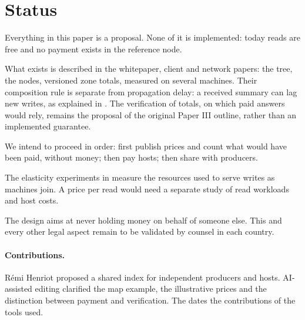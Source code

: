 \documentclass[11pt]{article}
\begin{document}
\section{Status}\hypertarget{ix:status}{}

Everything in this paper is a proposal. None of it is implemented: today reads are free and no payment exists in the reference node.

What exists is described in the whitepaper, client and network papers: the tree, the nodes, versioned zone totals, measured on several machines. Their composition rule is separate from propagation delay: a received summary can lag new writes, as explained in . The verification of totals, on which paid answers would rely, remains the proposal of the original Paper III outline, rather than an implemented guarantee.

We intend to proceed in order: first publish prices and count what would have been paid, without money; then pay hosts; then share with producers.

The elasticity experiments in  measure the resources used to serve writes as machines join. A price per read would need a separate study of read workloads and host costs.

The design aims at never holding money on behalf of someone else. This and every other legal aspect remain to be validated by counsel in each country.

\paragraph{Contributions.} Rémi Henriot proposed a shared index for independent producers and hosts. AI-assisted editing clarified the map example, the illustrative prices and the distinction between payment and verification. The  dates the contributions of the tools used.
\end{document}
